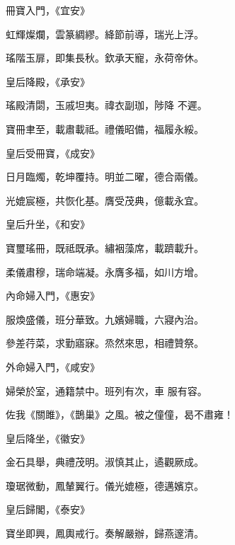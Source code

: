 \begin{pinyinscope}
 冊寶入門，《宜安》



 虹輝燦爛，雲篆綢繆。絳節前導，瑞光上浮。



 瑤階玉扉，即集長秋。欽承天寵，永荷帝休。



 皇后降殿，《承安》



 瑤殿清閟，玉戚坦夷。禕衣副珈，陟降
 不遲。



 寶冊聿至，載肅載祗。禮儀昭備，福履永綏。



 皇后受冊寶，《成安》



 日月臨燭，乾坤覆持。明並二曜，德合兩儀。



 光媲宸極，共恢化基。膺受茂典，億載永宜。



 皇后升坐，《和安》



 寶璽瑤冊，既祗既承。繡裀藻席，載躋載升。



 柔儀肅穆，瑞命端凝。永膺多福，如川方增。



 內命婦入門，《惠安》



 服煥盛儀，班分華致。九嬪婦職，六寢內治。



 參差荇菜，求勤寤寐。烝然來思，相禮贊祭。



 外命婦入門，《咸安》



 婦榮於室，通籍禁中。班列有次，車
 服有容。



 佐我《關雎》，《鵲巢》之風。被之僮僮，曷不肅雍！



 皇后降坐，《徽安》



 金石具舉，典禮茂明。淑慎其止，遹觀厥成。



 瓊琚微動，鳳輦翼行。儀光媲極，德邁嬪京。



 皇后歸閣，《泰安》



 寶坐即興，鳳輿戒行。奏解嚴辦，歸燕邃清。




\end{pinyinscope}
